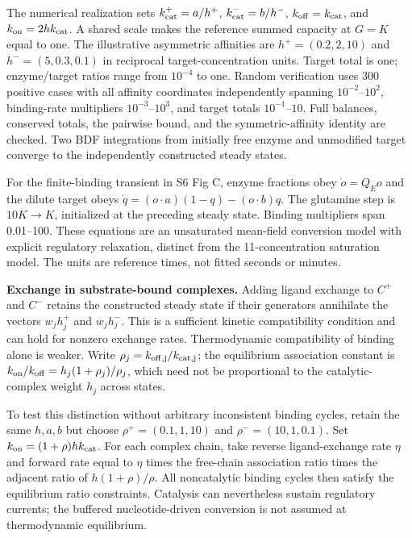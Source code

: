 \documentclass[11pt]{article}
\begin{document}
The numerical realization sets $k_{\rm cat}^+=a/h^+$, $k_{\rm cat}^-=b/h^-$, $k_{\rm off}=k_{\rm cat}$, and $k_{\rm on}=2h k_{\rm cat}$. A shared scale makes the reference summed capacity at $G=K$ equal to one. The illustrative asymmetric affinities are $h^+=(0.2,2,10)$ and $h^-=(5,0.3,0.1)$ in reciprocal target-concentration units. Target total is one; enzyme/target ratios range from $10^{-4}$ to one. Random verification uses 300 positive cases with all affinity coordinates independently spanning $10^{-2}$--$10^2$, binding-rate multipliers $10^{-3}$--$10^3$, and target totals $10^{-1}$--$10$. Full balances, conserved totals, the pairwise bound, and the symmetric-affinity identity are checked. Two BDF integrations from initially free enzyme and unmodified target converge to the independently constructed steady states.

For the finite-binding transient in S6 Fig C, enzyme fractions obey $\dot o=Q_Eo$ and the dilute target obeys $\dot q=(o\cdot a)(1-q)-(o\cdot b)q$. The glutamine step is $10K\to K$, initialized at the preceding steady state. Binding multipliers span 0.01--100. These equations are an unsaturated mean-field conversion model with explicit regulatory relaxation, distinct from the 11-concentration saturation model. The units are reference times, not fitted seconds or minutes.

\textbf{Exchange in substrate-bound complexes.} Adding ligand exchange to $C^+$ and $C^-$ retains the constructed steady state if their generators annihilate the vectors $w_jh_j^+$ and $w_jh_j^-$. This is a sufficient kinetic compatibility condition and can hold for nonzero exchange rates. Thermodynamic compatibility of binding alone is weaker. Write $\rho_j=k_{\rm off,j}/k_{\rm cat,j}$; the equilibrium association constant is $k_{\rm on}/k_{\rm off}=h_j(1+\rho_j)/\rho_j$, which need not be proportional to the catalytic-complex weight $h_j$ across states.

To test this distinction without arbitrary inconsistent binding cycles, retain the same $h,a,b$ but choose $\rho^+=(0.1,1,10)$ and $\rho^-=(10,1,0.1)$. Set $k_{\rm on}=(1+\rho)h k_{\rm cat}$. For each complex chain, take reverse ligand-exchange rate $\eta$ and forward rate equal to $\eta$ times the free-chain association ratio times the adjacent ratio of $h(1+\rho)/\rho$. All noncatalytic binding cycles then satisfy the equilibrium ratio constraints. Catalysis can nevertheless sustain regulatory currents; the buffered nucleotide-driven conversion is not assumed at thermodynamic equilibrium.
\end{document}
